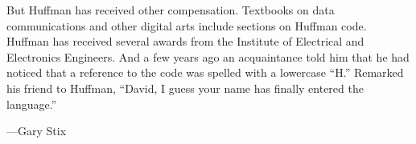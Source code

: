But Huffman has received other compensation. Textbooks on data communications 
and other digital arts include sections on Huffman code. Huffman has received 
several awards from the Institute of Electrical and Electronics Engineers. 
And a few years ago an acquaintance told him that he had noticed that a reference 
to the code was spelled with a lowercase ``H.'' Remarked his friend to Huffman, 
``David, I guess your name has finally entered the language.''

\noindent---Gary Stix
